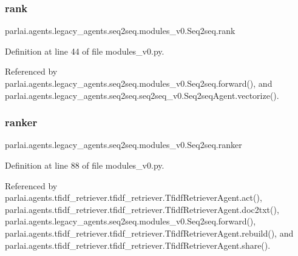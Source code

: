 \subsubsection{\texorpdfstring{rank}{rank}}
{\footnotesize\ttfamily parlai.\+agents.\+legacy\+\_\+agents.\+seq2seq.\+modules\+\_\+v0.\+Seq2seq.\+rank}



Definition at line 44 of file modules\+\_\+v0.\+py.



Referenced by parlai.\+agents.\+legacy\+\_\+agents.\+seq2seq.\+modules\+\_\+v0.\+Seq2seq.\+forward(), and parlai.\+agents.\+legacy\+\_\+agents.\+seq2seq.\+seq2seq\+\_\+v0.\+Seq2seq\+Agent.\+vectorize().

\mbox{\label{classparlai_1_1agents_1_1legacy__agents_1_1seq2seq_1_1modules__v0_1_1Seq2seq_a7a10ab57a8fe8989137f2b4cf28aa42c}} 
\subsubsection{\texorpdfstring{ranker}{ranker}}
{\footnotesize\ttfamily parlai.\+agents.\+legacy\+\_\+agents.\+seq2seq.\+modules\+\_\+v0.\+Seq2seq.\+ranker}



Definition at line 88 of file modules\+\_\+v0.\+py.



Referenced by parlai.\+agents.\+tfidf\+\_\+retriever.\+tfidf\+\_\+retriever.\+Tfidf\+Retriever\+Agent.\+act(), parlai.\+agents.\+tfidf\+\_\+retriever.\+tfidf\+\_\+retriever.\+Tfidf\+Retriever\+Agent.\+doc2txt(), parlai.\+agents.\+legacy\+\_\+agents.\+seq2seq.\+modules\+\_\+v0.\+Seq2seq.\+forward(), parlai.\+agents.\+tfidf\+\_\+retriever.\+tfidf\+\_\+retriever.\+Tfidf\+Retriever\+Agent.\+rebuild(), and parlai.\+agents.\+tfidf\+\_\+retriever.\+tfidf\+\_\+retriever.\+Tfidf\+Retriever\+Agent.\+share().

\mbox{\label{classparlai_1_1agents_1_1legacy__agents_1_1seq2seq_1_1modules__v0_1_1Seq2seq_af1a1661b40d32cbcfcf82f951fc46d16}} 
